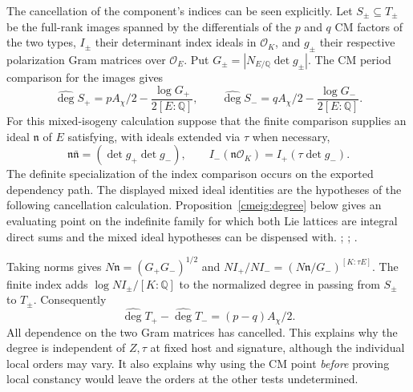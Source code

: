The cancellation of the component's indices can be seen explicitly.
Let \(S_\pm\subseteq T_\pm\) be the full-rank images spanned by the
differentials of the \(p\) and \(q\) CM factors of the two types,
\(I_\pm\) their determinant index ideals in \(\mathcal O_K\), and
\(g_\pm\) their respective polarization Gram matrices over
\(\mathcal O_E\). Put \(G_\pm=|N_{E/\mathbb Q}\det g_\pm|\).
The CM period comparison for the images gives
\[
 \widehat{\deg}S_+=pA_\chi/2-\frac{\log G_+}{2[E:\mathbb Q]},
 \qquad
 \widehat{\deg}S_-=qA_\chi/2-\frac{\log G_-}{2[E:\mathbb Q]} .
\]
For this mixed-isogeny calculation suppose that the finite comparison
supplies an ideal \(\mathfrak n\) of \(E\) satisfying, with ideals
extended via \(\tau\) when necessary,
\[
 \mathfrak n\bar{\mathfrak n}=(\det g_+\det g_-),\qquad
 I_-(\mathfrak n\mathcal O_K)=I_+(\tau\det g_-).
\]
The definite specialization of the index comparison occurs on the
exported dependency path. The displayed mixed ideal identities are
the hypotheses of the following cancellation calculation.
Proposition~\ref{cmeig:degree} below gives an evaluating point on
the indefinite family for which both Lie lattices are integral
direct sums and the mixed ideal hypotheses can be dispensed with.
;
;
.

Taking norms gives \(N\mathfrak n=(G_+G_-)^{1/2}\) and
\(NI_+/NI_-=(N\mathfrak n/G_-)^{[K:\tau E]}\). The finite index
adds \(\log NI_\pm/[K:\mathbb Q]\) to the normalized degree in
passing from \(S_\pm\) to \(T_\pm\). Consequently
\[
 \widehat{\deg}T_+-\widehat{\deg}T_-=(p-q)A_\chi/2 .
\]
All dependence on the two Gram matrices has cancelled. This
explains why the degree is independent of \(Z,\tau\) at fixed
host and signature, although the individual local orders may vary.
It also explains why using the CM point \emph{before} proving local
constancy would leave the orders at the other tests undetermined.

